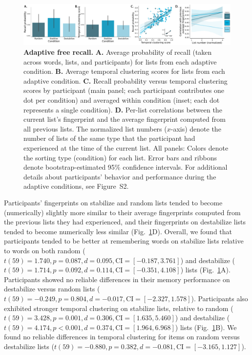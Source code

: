 \documentclass[11pt]{article}
\newcommand{\dynamicsAdaptive}{S2}
\begin{document}
\begin{figure}
    \centering

    \includegraphics[width=\textwidth]{figures/adaptive_results}

        \caption{\textbf{Adaptive free recall.} \textbf{A.} Average probability
        of recall (taken across words, lists, and participants) for lists from
        each adaptive condition. \textbf{B.} Average temporal clustering scores
        for lists from each adaptive condition. \textbf{C.} Recall probability
        versus temporal clustering scores by participant (main panel; each
        participant contributes one dot per condition) and averaged within
        condition (inset; each dot represents a single condition). \textbf{D.}
        Per-list correlations between the current list's fingerprint and the
        average fingerprint computed from all previous lists. The normalized
        list numbers ($x$-axis) denote the number of lists of the same type
        that the participant had experienced at the time of the current list.
        All panels: Colors denote the sorting type (condition) for each list.
        Error bars and ribbons denote bootstrap-estimated 95\% confidence
        intervals. For additional details about participants' behavior and
        performance during the adaptive conditions, see
        Figure~\dynamicsAdaptive.}

    \label{fig:adaptive}
\end{figure}

Participants' fingerprints on stabilize and random lists tended to become
(numerically) slightly more similar to their average fingerprints computed from
the previous lists they had experienced, and their fingerprints on destabilize
lists tended to become numerically less similar (Fig.~\ref{fig:adaptive}D).
Overall, we found that participants tended to be better at remembering words on
stabilize lists relative to words on both random ($t(59) = 1.740, p = 0.087, d
= 0.095, \mathrm{CI} = [-0.187, 3.761]$) and destabilize ($t(59) = 1.714, p =
0.092, d = 0.114, \mathrm{CI} = [-0.351, 4.108]$) lists
(Fig.~\ref{fig:adaptive}A). Participants showed no reliable differences in
their memory performance on destabilize versus random lists ($t(59) = -0.249, p
= 0.804, d = -0.017, \mathrm{CI} = [-2.327, 1.578]$). Participants also
exhibited stronger temporal clustering on stabilize lists, relative to random
($t(59) = 3.428, p = 0.001, d = 0.306, \mathrm{CI} = [1.635, 5.460]$) and
destabilize ($t(59) = 4.174, p < 0.001, d = 0.374, \mathrm{CI} = [1.964,
6.968]$) lists (Fig.~\ref{fig:adaptive}B). We found no reliable differences in
temporal clustering for items on random versus destabilize lists ($t(59) =
-0.880, p = 0.382, d = -0.081, \mathrm{CI} = [-3.165, 1.127]$).
\end{document}
